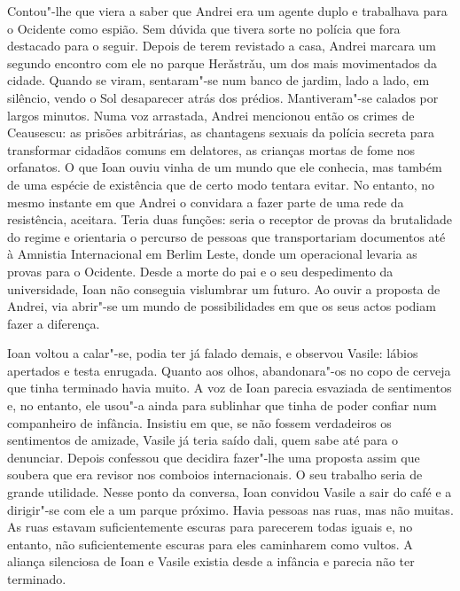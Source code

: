 Contou"-lhe que viera a saber que Andrei era um agente duplo e trabalhava
para o Ocidente como espião. Sem dúvida que tivera sorte no polícia que
fora destacado para o seguir. Depois de terem revistado a casa, Andrei
marcara um segundo encontro com ele no parque Herǎstrǎu, um dos mais
movimentados da cidade. Quando se viram, sentaram"-se num banco de
jardim, lado a lado, em silêncio, vendo o Sol desaparecer atrás dos
prédios. Mantiveram"-se calados por largos minutos. Numa voz arrastada,
Andrei mencionou então os crimes de Ceausescu: as prisões arbitrárias, as chantagens sexuais da polícia secreta para transformar
cidadãos comuns em delatores, as crianças mortas de fome nos orfanatos.
O que Ioan ouviu vinha de um mundo que ele conhecia, mas também de uma
espécie de existência que de certo modo tentara evitar. No entanto, no
mesmo instante em que Andrei o convidara a fazer parte de uma rede da
resistência, aceitara. Teria duas funções: seria o receptor de provas
da brutalidade do regime e orientaria o percurso de pessoas que
transportariam documentos até à Amnistia Internacional em Berlim Leste,
donde um operacional levaria as provas para o Ocidente. Desde a morte do
pai e o seu despedimento da universidade, Ioan não conseguia
vislumbrar um futuro. Ao ouvir a proposta de Andrei, via abrir"-se um
mundo de possibilidades em que os seus actos podiam fazer a diferença.

Ioan voltou a calar"-se, podia ter já falado demais, e
observou Vasile: lábios apertados e testa enrugada. Quanto aos olhos,
abandonara"-os no copo de cerveja que tinha terminado havia muito. A voz
de Ioan parecia esvaziada de sentimentos e, no entanto, ele usou"-a ainda
para sublinhar que tinha de poder confiar num companheiro de infância.
Insistiu em que, se não fossem verdadeiros os sentimentos de amizade,
Vasile já teria saído dali, quem sabe até para o denunciar. Depois
confessou que decidira fazer"-lhe uma proposta assim que soubera que era
revisor nos comboios internacionais. O seu trabalho seria de grande
utilidade. Nesse ponto da conversa, Ioan convidou Vasile a sair do café
e a dirigir"-se com ele a um parque próximo. Havia pessoas nas ruas, mas
não muitas. As ruas estavam suficientemente escuras para parecerem
todas iguais e, no entanto,
não suficientemente escuras para eles caminharem como vultos. A aliança
silenciosa de Ioan e Vasile existia desde a infância e parecia não ter
terminado.

